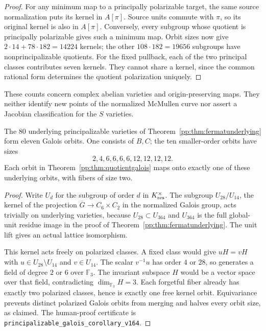 \begin{proof}
For any minimum map to a principally polarizable target, the same
source normalization puts its kernel in $A[\pi]$. Source units commute
with $\pi$, so its original kernel is also in $A[\pi]$. Conversely,
every subgroup whose quotient is principally polarizable gives such
a minimum map. Orbit sizes now give
$2\cdot14+78\cdot182=14224$ kernels; the other
$108\cdot182=19656$ subgroups have nonprincipalizable quotients.
For the fixed pullback, each of the two principal classes contributes
seven kernels. They cannot share a kernel, since the common rational
form determines the quotient polarization uniquely.
\end{proof}

These counts concern complex abelian varieties and origin-preserving
maps. They neither identify new points of the normalized McMullen
curve nor assert a Jacobian classification for the $S$ varieties.

\begin{corollary}
\label{pp:cor:underlyinggalois}
The $80$ underlying principalizable varieties of
Theorem~\ref{pp:thm:fermatunderlying} form eleven Galois orbits.
One consists of $B,C$; the ten smaller-order orbits have sizes
\[
2,4,6,6,6,6,12,12,12,12.
\]
Each orbit in Theorem~\ref{pp:thm:quotientgalois} maps onto exactly one
of these underlying orbits, with fibers of size two.
\end{corollary}
\begin{proof}
Write $U_d$ for the subgroup of order $d$ in
$K_{\rm res}^{\times}$. The subgroup $U_{28}/U_{14}$, the kernel of the projection
$\overline G\to C_6\times C_2$ in the normalized Galois group,
acts trivially on underlying varieties,
because $U_{28}\subset U_{364}$ and $U_{364}$ is the full global-unit
residue image in the proof of Theorem~\ref{pp:thm:fermatunderlying}.
The unit lift gives an actual lattice isomorphism.

This kernel acts freely on polarized classes. A fixed class would
give $uH=vH$ with $u\in U_{28}\setminus U_{14}$ and $v\in U_{14}$.
The scalar $v^{-1}u$ has order $4$ or $28$, so generates a field of
degree $2$ or $6$ over $\mathbb F_3$. The invariant subspace $H$
would be a vector space over that field, contradicting
$\dim_{\mathbb F_3}H=3$. Each forgetful fiber already has exactly
two polarized classes, hence is exactly one free kernel orbit.
Equivariance prevents distinct polarized Galois orbits from merging
and halves every orbit size, as claimed.
The human-proof certificate is
\texttt{principalizable\_galois\_corollary\_v164}.
\end{proof}

